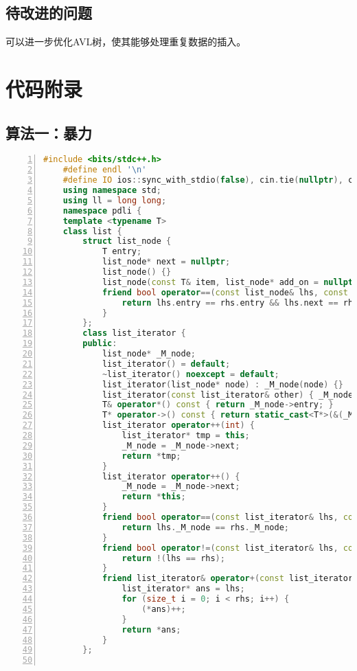 \documentclass{article}
\begin{document}
\subsection{待改进的问题}
可以进一步优化AVL树，使其能够处理重复数据的插入。
\normalsize
\section{代码附录}
\subsection{算法一：暴力}
\begin{lstlisting}[xleftmargin = 2em,xrightmargin = 2em, aboveskip = 0.5em, numbers = left, language = C++]
    #include <bits/stdc++.h>
    #define endl '\n'
    #define IO ios::sync_with_stdio(false), cin.tie(nullptr), cout.tie(nullptr)
    using namespace std;
    using ll = long long;
    namespace pdli {
    template <typename T>
    class list {
        struct list_node {
            T entry;
            list_node* next = nullptr;
            list_node() {}
            list_node(const T& item, list_node* add_on = nullptr) : entry(item), next(add_on) {}
            friend bool operator==(const list_node& lhs, const list_node& rhs) {
                return lhs.entry == rhs.entry && lhs.next == rhs.next;
            }
        };
        class list_iterator {
        public:
            list_node* _M_node;
            list_iterator() = default;
            ~list_iterator() noexcept = default;
            list_iterator(list_node* node) : _M_node(node) {}
            list_iterator(const list_iterator& other) { _M_node = other._M_node; }
            T& operator*() const { return _M_node->entry; }
            T* operator->() const { return static_cast<T*>(&(_M_node->entry)); }
            list_iterator operator++(int) {
                list_iterator* tmp = this;
                _M_node = _M_node->next;
                return *tmp;
            }
            list_iterator operator++() {
                _M_node = _M_node->next;
                return *this;
            }
            friend bool operator==(const list_iterator& lhs, const list_iterator& rhs) {
                return lhs._M_node == rhs._M_node;
            }
            friend bool operator!=(const list_iterator& lhs, const list_iterator& rhs) {
                return !(lhs == rhs);
            }
            friend list_iterator& operator+(const list_iterator& lhs, const size_t& rhs) {
                list_iterator* ans = lhs;
                for (size_t i = 0; i < rhs; i++) {
                    (*ans)++;
                }
                return *ans;
            }
        };


\end{lstlisting}
\end{document}
